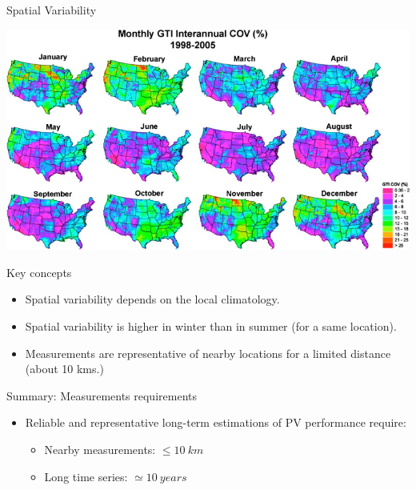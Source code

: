 \documentclass[xcolor={usenames,svgnames,dvipsnames}]{beamer}
\begin{document}
\begin{frame}[label={sec:orgeb6f713}]{Spatial Variability}
\begin{center}
\includegraphics[height=0.4\textheight]{../figs/SpatialVariability.jpg}
\end{center}

\begin{block}{Key concepts}
\begin{itemize}
\item Spatial variability depends on the \alert{local climatology}.
\item Spatial variability is \alert{higher in winter than in summer} (for a same location).
\item Measurements are representative of nearby locations for a \alert{limited distance} (about 10 kms.)
\end{itemize}
\end{block}
\end{frame}

\begin{frame}[label={sec:orgb179055}]{Summary: Measurements requirements}
\begin{itemize}
\item Reliable and representative long-term estimations of PV performance require:
\begin{itemize}
\item \alert{Nearby measurements}: \(\leq \SI{10}{km}\)
\item \alert{Long time series}: \(\simeq \SI{10}{years}\)
\end{itemize}
\end{itemize}
\end{frame}
\end{document}
